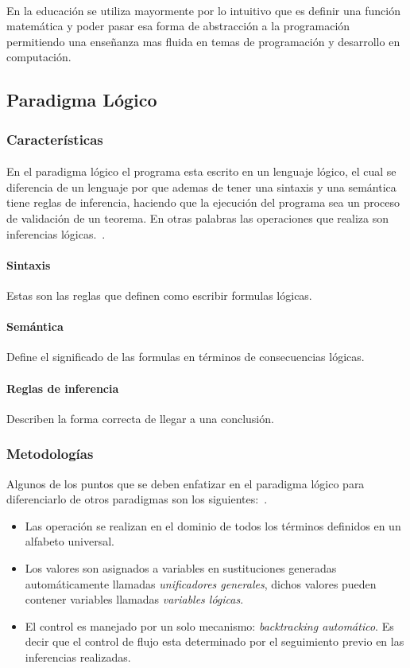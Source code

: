 \documentclass[12pt]{article}
\begin{document}
		\paragraph{}
		En la educación se utiliza mayormente por lo intuitivo que es definir una función matemática y poder pasar esa forma de abstracción a la programación permitiendo una enseñanza mas fluida en temas de programación y desarrollo en computación.
		
		
		
		
		
		\subsection{Paradigma Lógico}
		\subsubsection{Características}
		\paragraph{}
		En el paradigma lógico el programa esta escrito en un lenguaje lógico, el cual se diferencia de un lenguaje por que ademas de tener una sintaxis y una semántica tiene reglas de inferencia, haciendo que la ejecución del programa sea un proceso de validación de un teorema. En otras palabras las operaciones que realiza son inferencias lógicas.~\cite{introductioin_lp}.
		\paragraph{Sintaxis} Estas son las reglas que definen como escribir formulas lógicas.
		\paragraph{Semántica} Define el significado de las formulas en términos de consecuencias lógicas.
		\paragraph{Reglas de inferencia} Describen la forma correcta de llegar a una conclusión.
		\subsubsection{Metodologías}
		Algunos de los puntos que se deben enfatizar en el paradigma lógico para diferenciarlo de otros paradigmas son los siguientes:~\cite{DBLP:journals/corr/cs-PL-0107013}.
			\begin{itemize}
			\item Las operación se realizan en el dominio de todos los términos definidos en un alfabeto universal. 
			\item Los valores son asignados a variables en sustituciones generadas automáticamente llamadas \textit{unificadores generales}, dichos valores pueden contener variables llamadas \textit{variables lógicas}.
			\item El control es manejado por un solo mecanismo: \textit{backtracking automático}. Es decir que el control de flujo esta determinado por el seguimiento previo en las inferencias realizadas.
		\end{itemize}
				\pagebreak
\end{document}
